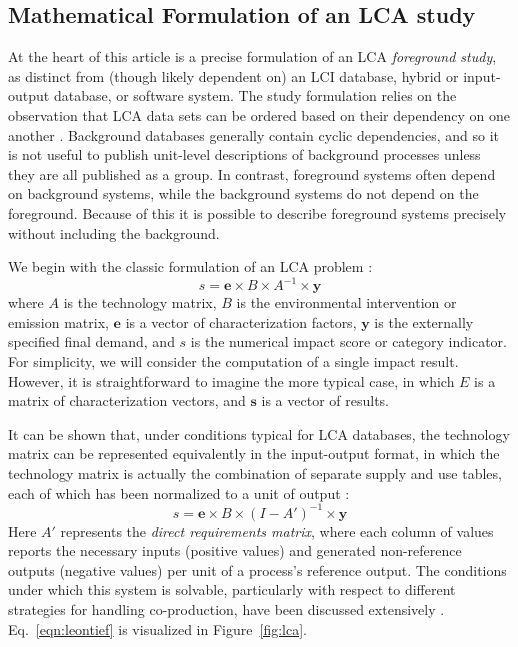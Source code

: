 \subsection{Mathematical Formulation of an LCA study}

At the heart of this article is a precise formulation of an LCA \emph{foreground study}, as distinct from (though likely dependent on) an LCI database, hybrid or input-output database, or software system.  The study formulation relies on the observation that LCA data sets can be ordered based on their dependency on one another \citep{Kuczenski_JLCA_2015}.  Background databases generally contain cyclic dependencies, and so it is not useful to publish unit-level descriptions of background processes unless they are all published as a group.
In contrast, foreground systems often %
depend on background systems, while the background systems do not %
depend on the foreground.  Because of this it is possible to describe foreground systems precisely %
without including the background.

We begin with the classic formulation of an LCA problem \citep{Heijungs2002}:
\begin{equation}
s = \mathbf{e} \times B \times A^{-1} \times \mathbf{y}
\end{equation}
where $A$ is the technology matrix, $B$ is the environmental intervention or emission matrix, $\mathbf{e}$ is a vector of characterization factors, $\mathbf{y}$ is the externally specified final demand, and $s$ is the numerical impact score or category indicator.   For simplicity, we will consider the computation of a single impact result.  However, it is straightforward to imagine the more typical case, in which $E$ is a matrix of characterization vectors, and $\mathbf{s}$ is a vector of results.


It can be shown that, under conditions typical for LCA databases, the technology matrix can be represented equivalently in the input-output format, in which the technology matrix is actually the combination of separate supply and use tables, each of which has been normalized to a unit of output \citep{Suh_JIE_2010, Pauliuk_2015_framework}:
\begin{equation}
s = \mathbf{e} \times B \times \left(I - A'\right)^{-1} \times \mathbf{y}
\label{eqn:leontief}
\end{equation}
Here $A'$ represents the \emph{direct requirements matrix}, where each column of values reports the necessary inputs (positive values) and generated non-reference outputs (negative values) per unit of a process's reference output.  The conditions under which this system is solvable, particularly with respect to different strategies for handling co-production, have been discussed extensively \citep{Majeau_Bettez_2014}.  Eq.~\ref{eqn:leontief} is visualized in Figure~\ref{fig:lca}. 

